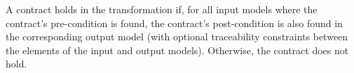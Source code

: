 A contract holds in the transformation if, for all input models where the contract's pre-condition is found, the contract's post-condition is also found in the corresponding output model (with optional traceability constraints between the elements of the input and output models). Otherwise, the contract does not hold.






